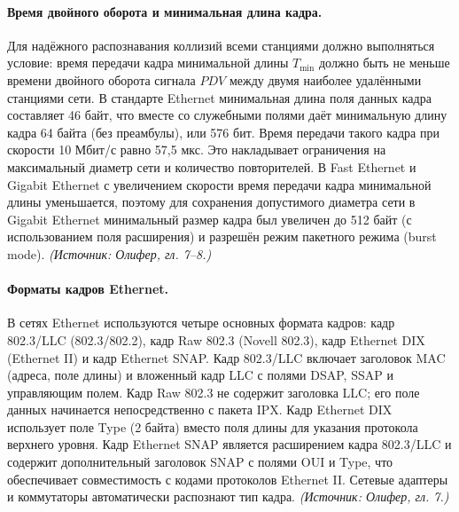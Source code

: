 \documentclass[a4paper,12pt]{article}
\begin{document}
\paragraph{Время двойного оборота и минимальная длина кадра.}
Для надёжного распознавания коллизий всеми станциями должно выполняться условие: время передачи кадра минимальной длины \(T_{\min}\) должно быть не меньше времени двойного оборота сигнала \(PDV\) между двумя наиболее удалёнными станциями сети. В стандарте Ethernet минимальная длина поля данных кадра составляет 46 байт, что вместе со служебными полями даёт минимальную длину кадра 64 байта (без преамбулы), или 576 бит. Время передачи такого кадра при скорости 10 Мбит/с равно 57,5 мкс. Это накладывает ограничения на максимальный диаметр сети и количество повторителей. В Fast Ethernet и Gigabit Ethernet с увеличением скорости время передачи кадра минимальной длины уменьшается, поэтому для сохранения допустимого диаметра сети в Gigabit Ethernet минимальный размер кадра был увеличен до 512 байт (с использованием поля расширения) и разрешён режим пакетного режима (burst mode).
\textit{(Источник: Олифер, гл. 7–8.)}

\paragraph{Форматы кадров Ethernet.}
В сетях Ethernet используются четыре основных формата кадров: кадр 802.3/LLC (802.3/802.2), кадр Raw 802.3 (Novell 802.3), кадр Ethernet DIX (Ethernet II) и кадр Ethernet SNAP. Кадр 802.3/LLC включает заголовок MAC (адреса, поле длины) и вложенный кадр LLC с полями DSAP, SSAP и управляющим полем. Кадр Raw 802.3 не содержит заголовка LLC; его поле данных начинается непосредственно с пакета IPX. Кадр Ethernet DIX использует поле Type (2 байта) вместо поля длины для указания протокола верхнего уровня. Кадр Ethernet SNAP является расширением кадра 802.3/LLC и содержит дополнительный заголовок SNAP с полями OUI и Type, что обеспечивает совместимость с кодами протоколов Ethernet II. Сетевые адаптеры и коммутаторы автоматически распознают тип кадра.
\textit{(Источник: Олифер, гл. 7.)}
\end{document}
